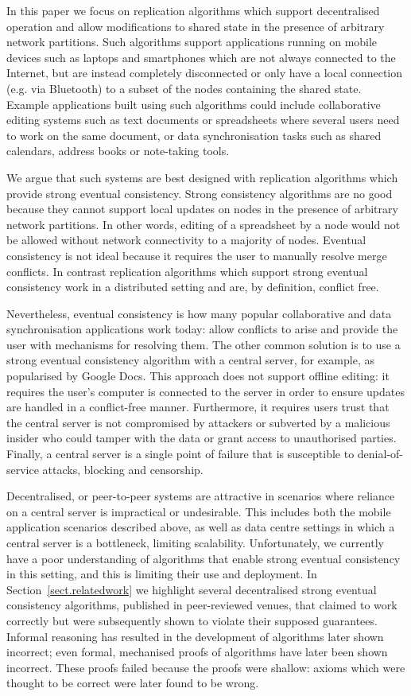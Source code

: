 \documentclass[acmlarge,review,anonymous]{acmart}\settopmatter{printfolios=true}
\begin{document}
In this paper we focus on replication algorithms which support decentralised operation and allow modifications to shared state in the presence of arbitrary network partitions.
Such algorithms support applications running on mobile devices such as laptops and smartphones which are not always connected to the Internet, but are instead completely disconnected or only have a local connection (e.g. via Bluetooth) to a subset of the nodes containing the shared state.
Example applications built using such algorithms could include collaborative editing systems such as text documents or spreadsheets where several users need to work on the same document, or data synchronisation tasks such as shared calendars, address books or note-taking tools.

We argue that such systems are best designed with replication algorithms which provide strong eventual consistency. Strong consistency algorithms are no good because they cannot support local updates on nodes in the presence of arbitrary network partitions.
In other words, editing of a spreadsheet by a node would not be allowed without network connectivity to a majority of nodes.
Eventual consistency is not ideal because it requires the user to manually resolve merge conflicts.
In contrast replication algorithms which support strong eventual consistency work in a distributed setting and are, by definition, conflict free.

Nevertheless, eventual consistency is how many popular collaborative and data synchronisation applications work today: allow
conflicts to arise and provide the user with mechanisms for resolving them.
The other common solution is to use a strong eventual consistency algorithm with a central server, for example, as popularised by Google Docs.
This approach does not support offline editing: it requires the user's computer is connected to the server in order to ensure updates are handled in a conflict-free manner.
Furthermore, it requires users trust that the central server is not compromised by attackers or subverted by a malicious insider who could tamper with the data or grant access to unauthorised parties.
Finally, a central server is a single point of failure that is susceptible to denial-of-service attacks, blocking and censorship.

Decentralised, or peer-to-peer systems are attractive in scenarios where reliance on a central server is impractical or undesirable.
This includes both the mobile application scenarios described above, as well as data centre settings in which a central server is a bottleneck, limiting scalability.
Unfortunately, we currently have a poor understanding of algorithms that enable strong eventual consistency in this setting, and this is limiting their use and deployment.
In Section~\ref{sect.relatedwork} we highlight several decentralised strong eventual consistency algorithms, published in peer-reviewed venues, that claimed to work correctly but were subsequently shown to violate their supposed guarantees. 
Informal reasoning has resulted in the development of algorithms later shown incorrect; even formal, mechanised proofs of algorithms have later been shown incorrect.
These proofs failed because the proofs were shallow: axioms which were thought to be correct were later found to be wrong.
\end{document}
